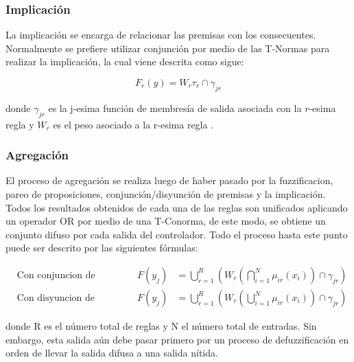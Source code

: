         \subsubsection{Implicación}

            La implicación se encarga de relacionar las premisas con los consecuentes. Normalmente se prefiere utilizar conjunción por medio de las T-Normas para realizar la implicación, la cual viene descrita como sigue:

            \begin{equation}\label{eq:implicacion}
                F_r(y) = W_r \tau_{r} \cap \gamma_{jr}
            \end{equation}

            \noindent donde $\gamma_{jr}$ es la j-esima función de membresía de salida asociada con la $r$-esima regla y $W_r$ es el peso asociado a la r-esima regla \Parencite{riid2003transparent}.

        \subsubsection{Agregación}

            El proceso de agregación se realiza luego de haber pasado por la fuzzificacion, pareo de proposiciones, conjunción/disyunción de premisas y la implicación. Todos los resultados obtenidos de cada una de las reglas son unificados aplicando un operador OR por medio de una T-Conorma, de este modo, se obtiene un conjunto difuso por cada salida del controlador. Todo el proceso hasta este punto puede ser descrito por las siguientes fórmulas:

            \vspace{10pt}
            \begin{align}
                &\text{Con conjuncion de premisas:} & F(y_j) &= \bigcup_{r=1}^{R}\left(W_r \left(\bigcap_{i=1}^{N}\mu_{ir}(x_i) \right) \cap \gamma_{jr}\right) \label{eq:fconjuncion} \\
                &\text{Con disyuncion de premisas:} & F(y_j) &= \bigcup_{r=1}^{R}\left(W_r \left(\bigcup_{i=1}^{N}\mu_{ir}(x_i) \right) \cap \gamma_{jr}\right) \label{eq:fdisyuncion}
            \end{align}
            \vspace{10pt}

            \noindent donde R es el número total de reglas y N el número total de entradas. Sin embargo, esta salida aún debe pasar primero por un proceso de defuzzificación en orden de llevar la salida difusa a una salida nítida.

